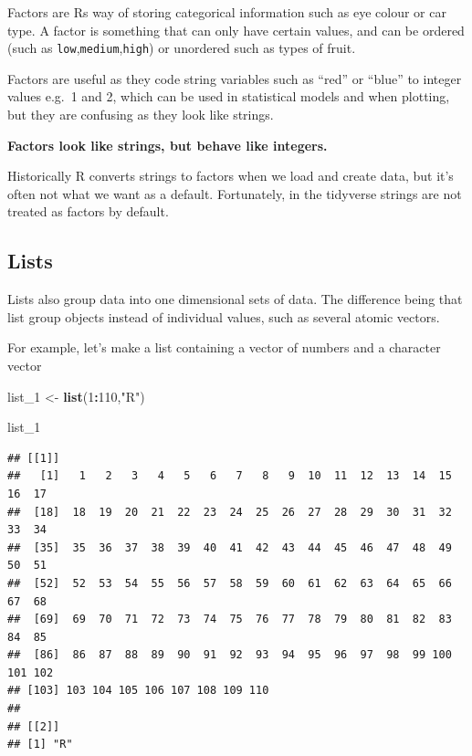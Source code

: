 \documentclass[12pt,]{book}
\newenvironment{Shaded}{\begin{snugshade}}{\end{snugshade}}
\newcommand{\DecValTok}[1]{\textcolor[rgb]{0.00,0.00,0.81}{#1}}
\newcommand{\KeywordTok}[1]{\textcolor[rgb]{0.13,0.29,0.53}{\textbf{#1}}}
\newcommand{\NormalTok}[1]{#1}
\newcommand{\OperatorTok}[1]{\textcolor[rgb]{0.81,0.36,0.00}{\textbf{#1}}}
\newcommand{\StringTok}[1]{\textcolor[rgb]{0.31,0.60,0.02}{#1}}
\begin{document}
Factors are Rs way of storing categorical information such as eye colour or
car type. A factor is something that can only have certain values, and can be
ordered (such as \texttt{low},\texttt{medium},\texttt{high}) or unordered such as types of fruit.

Factors are useful as they code string variables such as ``red'' or ``blue'' to integer values e.g.~1 and 2, which can be used in statistical models and when plotting, but they are confusing as they look like strings.

\textbf{Factors look like strings, but behave like integers.}

Historically R converts strings to factors when we load and create data, but
it's often not what we want as a default. Fortunately, in the tidyverse strings
are not treated as factors by default.

\hypertarget{lists}{%
\subsection{Lists}\label{lists}}

Lists also group data into one dimensional sets of data. The difference being
that list group objects instead of individual values, such as several atomic
vectors.

For example, let's make a list containing a vector of numbers and a character
vector

\begin{Shaded}
\begin{Highlighting}[]
\NormalTok{list_}\DecValTok{1}\NormalTok{ <-}\StringTok{ }\KeywordTok{list}\NormalTok{(}\DecValTok{1}\OperatorTok{:}\DecValTok{110}\NormalTok{,}\StringTok{"R"}\NormalTok{)}

\NormalTok{list_}\DecValTok{1}
\end{Highlighting}
\end{Shaded}

\begin{verbatim}
## [[1]]
##   [1]   1   2   3   4   5   6   7   8   9  10  11  12  13  14  15  16  17
##  [18]  18  19  20  21  22  23  24  25  26  27  28  29  30  31  32  33  34
##  [35]  35  36  37  38  39  40  41  42  43  44  45  46  47  48  49  50  51
##  [52]  52  53  54  55  56  57  58  59  60  61  62  63  64  65  66  67  68
##  [69]  69  70  71  72  73  74  75  76  77  78  79  80  81  82  83  84  85
##  [86]  86  87  88  89  90  91  92  93  94  95  96  97  98  99 100 101 102
## [103] 103 104 105 106 107 108 109 110
## 
## [[2]]
## [1] "R"
\end{verbatim}
\end{document}
